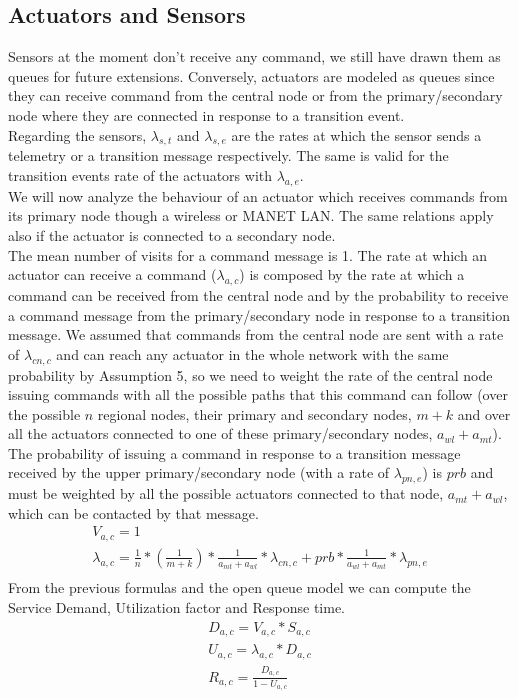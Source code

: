 \documentclass[11pt]{article}
\begin{document}
\subsection{Actuators and Sensors}
Sensors at the moment don't receive any command, we still have drawn them as queues for future extensions. Conversely, actuators are modeled as queues since they can receive command from the central node or from the primary/secondary node where they are connected in response to a transition event.\\
Regarding the sensors, $\lambda_{s,t}$ and $\lambda_{s,e}$ are the rates at which the sensor sends a telemetry or a transition message respectively. The same is valid for the transition events rate of the actuators with $\lambda_{a,e}$.\\
We will now analyze the behaviour of an actuator which receives commands from its primary node though a wireless or MANET LAN. The same relations apply also if the actuator is connected to a secondary node.\\
The mean number of visits for a command message is 1.
The rate at which an actuator can receive a command ($\lambda_{a,c}$) is composed by the rate at which a command can be received from the central node and by the probability to receive a command message from the primary/secondary node in response to a transition message. We assumed that commands from the central node are sent with a rate of $\lambda_{cn,c}$ and can reach any actuator in the whole network with the same probability by Assumption 5, so we need to weight the rate of the central node issuing commands with all the possible paths that this command can follow (over the possible $n$ regional nodes, their primary and secondary nodes, $m+k$ and over all the actuators connected to one of these primary/secondary nodes, $a_{wl}+a_{mt}$). The probability of issuing a command in response to a transition message received by the upper primary/secondary node (with a rate of $\lambda_{pn,e}$) is $prb$ and must be weighted by all the possible actuators connected to that node, $a_{mt}+a_{wl}$, which can be contacted by that message.
\begin{equation}
	\begin{array}{l}
		V_{a,c} = 1 \\
		\lambda_{a, c} = \frac{1}{n} * (\frac{1}{m+k}) * \frac{1}{a_{mt}+a_{wl}} * \lambda_{cn, c} + prb * \frac{1}{a_{wl}+a_{mt}} * \lambda_{pn,e}   \\
	\end{array}
\end{equation}
From the previous formulas and the open queue model we can compute the Service Demand, Utilization factor and Response time.
\begin{equation}
	\begin{array}{l}
		D_{a, c} = V_{a, c} * S_{a, c} \\
		U_{a, c} = \lambda_{a, c} * D_{a, c} \\
		R_{a, c} = \frac{D_{a, c}}{1 - U_{a,c}} \\
	\end{array}
\end{equation}
\end{document}
